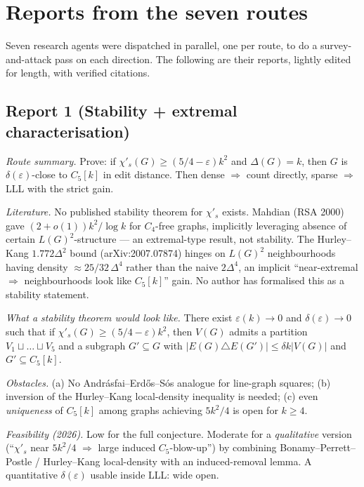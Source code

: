 \documentclass[11pt]{article}
\newcommand{\sci}{\chi'_s}
\begin{document}
\section*{Reports from the seven routes}

Seven research agents were dispatched in parallel, one per route, to
do a survey-and-attack pass on each direction. The following are
their reports, lightly edited for length, with verified citations.

\subsection*{Report 1 (Stability + extremal characterisation)}

\emph{Route summary.} Prove: if $\sci(G) \geq (5/4 - \varepsilon)k^2$ and
$\Delta(G) = k$, then $G$ is $\delta(\varepsilon)$-close to $C_5[k]$
in edit distance. Then dense $\Rightarrow$ count directly,
sparse $\Rightarrow$ LLL with the strict gain.

\emph{Literature.} No published stability theorem for $\sci$ exists.
Mahdian (RSA 2000) gave $(2+o(1))k^2/\log k$ for $C_4$-free graphs,
implicitly leveraging absence of certain $L(G)^2$-structure --- an
extremal-type result, not stability. The Hurley--Kang
$1.772\Delta^2$ bound (arXiv:2007.07874) hinges on $L(G)^2$
neighbourhoods having density $\approx 25/32\,\Delta^4$ rather than
the naive $2\Delta^4$, an implicit ``near-extremal $\Rightarrow$
neighbourhoods look like $C_5[k]$'' gain. No author has formalised
this as a stability statement.

\emph{What a stability theorem would look like.} There exist
$\varepsilon(k) \to 0$ and $\delta(\varepsilon) \to 0$ such that if
$\sci(G) \geq (5/4-\varepsilon)k^2$, then $V(G)$ admits a partition
$V_1 \sqcup \dots \sqcup V_5$ and a subgraph $G' \subseteq G$ with
$|E(G) \triangle E(G')| \leq \delta k |V(G)|$ and $G' \subseteq C_5[k]$.

\emph{Obstacles.} (a) No Andr\'asfai--Erd\H{o}s--S\'os analogue for
line-graph squares; (b) inversion of the Hurley--Kang local-density
inequality is needed; (c) even \emph{uniqueness} of $C_5[k]$ among
graphs achieving $5k^2/4$ is open for $k \geq 4$.

\emph{Feasibility (2026).} Low for the full conjecture. Moderate for a
\emph{qualitative} version (``$\sci$ near $5k^2/4$ $\Rightarrow$
large induced $C_5$-blow-up'') by combining
Bonamy--Perrett--Postle / Hurley--Kang local-density with an
induced-removal lemma. A quantitative $\delta(\varepsilon)$ usable
inside LLL: wide open.
\end{document}
